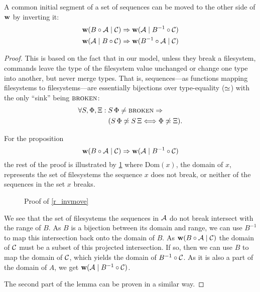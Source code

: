 \begin{mylem}\label{r_invmove}
A common initial segment of a set of sequences can be moved to the other side of $\mathbf{w}$ by inverting it:
\begin{gather*}
\mathbf{w}({B\circ \mathcal{A}}\mathrel{|}{\mathcal{C}}) \Rightarrow \mathbf{w}({\mathcal{A}}\mathrel{|}{B^{-1}\circ \mathcal{C}}) \\
\mathbf{w}({\mathcal{A}}\mathrel{|}{B\circ \mathcal{C}}) \Rightarrow \mathbf{w}({B^{-1}\circ \mathcal{A}}\mathrel{|}{\mathcal{C}})
\end{gather*}
\end{mylem}
\begin{proof}
This is based on the fact that in our model, unless they break a filesystem,
commands leave the type of the filesystem value unchanged 
or change one type into another, but never merge types.
That is,
sequences---as functions mapping filesystems to filesystems---are
essentially bijections over type-equality ($\simeq$)
with the only ``sink'' being $\text{\normalfont\scshape{broken}}$:
\begin{align*}
\forall S,\Phi,\Xi:{}&S\,\Phi\neq\text{\normalfont\scshape{broken}} \Rightarrow \\
&(S\,\Phi\not\simeq S\,\Xi \Longleftrightarrow \Phi\not\simeq \Xi).
\end{align*}

For the proposition
\[ \mathbf{w}({B\circ \mathcal{A}}\mathrel{|}{\mathcal{C}}) \Rightarrow \mathbf{w}({\mathcal{A}}\mathrel{|}{B^{-1}\circ \mathcal{C}}) \]
the rest of the proof is illustrated by \cref{fig_invmove}
where $\textrm{Dom}(x)$, the domain of $x$, represents the set of filesystems
the sequence $x$ does not break, or neither of the sequences in the set $x$ breaks.

\begin{figure}[htb]

\caption{Proof of \cref{r_invmove}}\label{fig_invmove}
\end{figure}

We see that the set of filesystems the sequences in $\mathcal{A}$ do not break intersect with the range of $B$.
As $B$ is a bijection between its domain and range, we can use $B^{-1}$ to map this intersection back
onto the domain of $B$.
As $\mathbf{w}({B\circ \mathcal{A}}\mathrel{|}{\mathcal{C}})$ the domain of $\mathcal{C}$ must be a subset of this
projected intersection.
If so, then we can use $B$ to map the domain of $\mathcal{C}$, which yields the domain of $B^{-1}\circ \mathcal{C}$.
As it is also a part of the domain of $A$, we get $\mathbf{w}({\mathcal{A}}\mathrel{|}{B^{-1}\circ \mathcal{C}})$.

The second part of the lemma can be proven in a similar way.
\end{proof}


